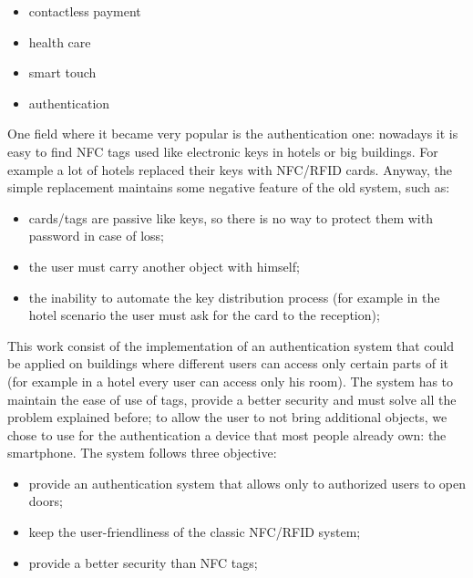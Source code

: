 \documentclass[conference]{IEEEtran}
\begin{document}
\begin{itemize}
 \item contactless payment
 \item health care
 \item smart touch
 \item authentication
\end{itemize}

One field where it became very popular is the authentication one: nowadays it is easy to find NFC tags used like electronic keys in hotels or big buildings.
For example a lot of hotels replaced their keys with NFC/RFID cards. Anyway, the simple replacement maintains some negative feature of the old system, such as:

\begin{itemize}
 \item cards/tags are passive like keys, so there is no way to protect them with password in case of loss;
 \item the user must carry another object with himself;
 \item the inability to automate the key distribution process (for example in the hotel scenario the user must ask for the card to the reception);
\end{itemize}

This work consist of the implementation of an authentication system that could be applied on buildings where different users can access only certain parts of it (for example in a hotel every user can access only his room). The system has to maintain the ease of use of tags, provide a better security and must solve all the problem explained before; to allow the user to not bring additional objects, we chose to use for the authentication a device that most people already own: the smartphone.
The system follows three objective:

\begin{itemize}
 \item provide an authentication system that allows only to authorized users to open doors;
 \item keep the user-friendliness of the classic NFC/RFID system;
 \item provide a better security than NFC tags;
\end{itemize}
\end{document}
